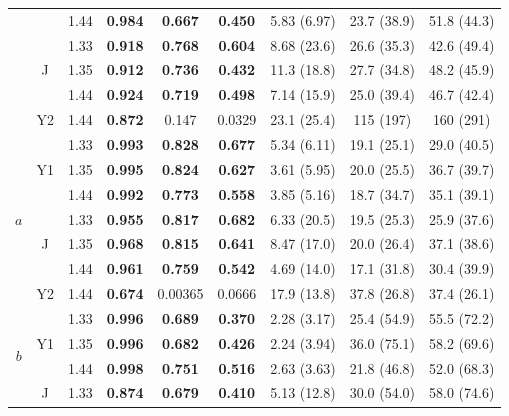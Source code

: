 \begin{subappendices}
\begin{table}[htb!]
\begin{tabular}{|ccc|ccc|ccc|}
        & & 1.44 & \textbf{0.984} & \textbf{0.667} & \textbf{0.450} & 5.83 (6.97) & 23.7 (38.9) & 51.8 (44.3)\\
        \cline{2-9}
        & \multirow{3}{*}{J} & 1.33 & \textbf{0.918} & \textbf{0.768} & \textbf{0.604} & 8.68 (23.6) & 26.6 (35.3) & 42.6 (49.4) \\
        & & 1.35 & \textbf{0.912} & \textbf{0.736} & \textbf{0.432} & 11.3 (18.8) & 27.7 (34.8) & 48.2 (45.9) \\
        & & 1.44 & \textbf{0.924} & \textbf{0.719} & \textbf{0.498} & 7.14 (15.9) & 25.0 (39.4) & 46.7 (42.4) \\
        \cline{2-9}
        & Y2 & 1.44 & \textbf{0.872} & 0.147 & 0.0329 & 23.1 (25.4) & 115 (197) & 160 (291) \\
        \hline
        \multirow{7}{*}{$a$} & \multirow{3}{*}{Y1} & 1.33 & \textbf{0.993} & \textbf{0.828} & \textbf{0.677} & 5.34 (6.11) & 19.1 (25.1) & 29.0 (40.5) \\
        & & 1.35 & \textbf{0.995} & \textbf{0.824} & \textbf{0.627} & 3.61 (5.95) & 20.0 (25.5) & 36.7 (39.7) \\
        & & 1.44 & \textbf{0.992} & \textbf{0.773} & \textbf{0.558} & 3.85 (5.16) & 18.7 (34.7) & 35.1 (39.1) \\
        \cline{2-9}
        & \multirow{3}{*}{J} & 1.33 & \textbf{0.955} & \textbf{0.817} & \textbf{0.682} & 6.33 (20.5) & 19.5 (25.3) & 25.9 (37.6) \\
        & & 1.35 & \textbf{0.968} & \textbf{0.815} & \textbf{0.641} & 8.47 (17.0) & 20.0 (26.4) & 37.1 (38.6) \\
        & & 1.44 & \textbf{0.961} & \textbf{0.759} & \textbf{0.542} & 4.69 (14.0) & 17.1 (31.8) & 30.4 (39.9) \\
        \cline{2-9}
        & Y2 & 1.44 & \textbf{0.674} & 0.00365 & 0.0666 & 17.9 (13.8) & 37.8 (26.8) & 37.4 (26.1) \\
        \hline
        \multirow{9}{*}{$b$} & \multirow{3}{*}{Y1} & 1.33 & \textbf{0.996} & \textbf{0.689} & \textbf{0.370} & 2.28 (3.17) & 25.4 (54.9) & 55.5 (72.2) \\
        & & 1.35 & \textbf{0.996} & \textbf{0.682} & \textbf{0.426} & 2.24 (3.94) & 36.0 (75.1) & 58.2 (69.6) \\
        & & 1.44 & \textbf{0.998} & \textbf{0.751} & \textbf{0.516} & 2.63 (3.63) & 21.8 (46.8) & 52.0 (68.3) \\
        \cline{2-9}
        & \multirow{3}{*}{J} & 1.33 & \textbf{0.874} & \textbf{0.679} & \textbf{0.410} & 5.13 (12.8) & 30.0 (54.0) & 58.0 (74.6) \\

\end{tabular}
\end{table}
\end{subappendices}
